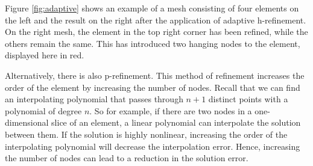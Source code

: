 Figure \ref{fig:adaptive} shows an example of a mesh consisting of four elements on the left and the result on the right after the application of adaptive h-refinement.
On the right mesh, the element in the top right corner has been refined, while the others remain the same.
This has introduced two hanging nodes to the element, displayed here in red.

Alternatively, there is also p-refinement.
This method of refinement increases the order of the element by increasing the number of nodes.
Recall that we can find an interpolating polynomial that passes through $n+1$ distinct points with a polynomial of degree $n$.
So for example, if there are two nodes in a one-dimensional slice of an element, a linear polynomial can interpolate the solution between them.
If the solution is highly nonlinear, increasing the order of the interpolating polynomial will decrease the interpolation error.
Hence, increasing the number of nodes can lead to a reduction in the solution error.

